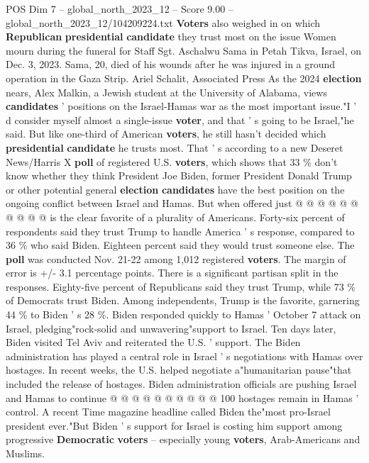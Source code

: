\begin{textsample}{POS Dim 7 – global\_north\_2023\_12 – Score 9.00 – global\_north\_2023\_12/104209224.txt}  \label{ex:f7_pos_154}
\textbf{Voters} also weighed in on which \textbf{Republican} \textbf{presidential} \textbf{candidate} they trust most on the issue Women mourn during the funeral for Staff Sgt.
Aschalwu Sama in Petah Tikva, Israel, on Dec. 3, 2023.
Sama, 20, died of his wounds after he was injured in a ground operation in the Gaza Strip.
Ariel Schalit, Associated Press As the 2024 \textbf{election} nears, Alex Malkin, a Jewish student at the University of Alabama, views \textbf{candidates} ' positions on the Israel-Hamas war as the most important issue."I ' d consider myself almost a single-issue \textbf{voter}, and that ' s going to be Israel,"he said.
But like one-third of American \textbf{voters}, he still hasn't decided which \textbf{presidential} \textbf{candidate} he trusts most.
That ' s according to a new Deseret News/Harris X \textbf{poll} of registered U.S. \textbf{voters}, which shows that 33 \% don't know whether they think President Joe Biden, former President Donald Trump or other potential general \textbf{election} \textbf{candidates} have the best position on the ongoing conflict between Israel and Hamas.
But when offered just @ @ @ @ @ @ @ @ @ @ is the clear favorite of a plurality of Americans.
Forty-six percent of respondents said they trust Trump to handle America ' s response, compared to 36 \% who said Biden.
Eighteen percent said they would trust someone else.
The \textbf{poll} was conducted Nov. 21-22 among 1,012 registered \textbf{voters}.
The margin of error is +/- 3.1 percentage points.
There is a significant partisan split in the responses.
Eighty-five percent of Republicans said they trust Trump, while 73 \% of Democrats trust Biden.
Among independents, Trump is the favorite, garnering 44 \% to Biden ' s 28 \%.
Biden responded quickly to Hamas ' October 7 attack on Israel, pledging"rock-solid and unwavering"support to Israel.
Ten days later, Biden visited Tel Aviv and reiterated the U.S. ' support.
The Biden administration has played a central role in Israel ' s negotiations with Hamas over hostages.
In recent weeks, the U.S. helped negotiate a"humanitarian pause"that included the release of hostages.
Biden administration officials are pushing Israel and Hamas to continue @ @ @ @ @ @ @ @ @ @ 100 hostages remain in Hamas ' control.
A recent Time magazine headline called Biden the"most pro-Israel president ever."But Biden ' s support for Israel is costing him support among progressive \textbf{Democratic} \textbf{voters} -- especially young \textbf{voters}, Arab-Americans and Muslims.

\end{textsample}
